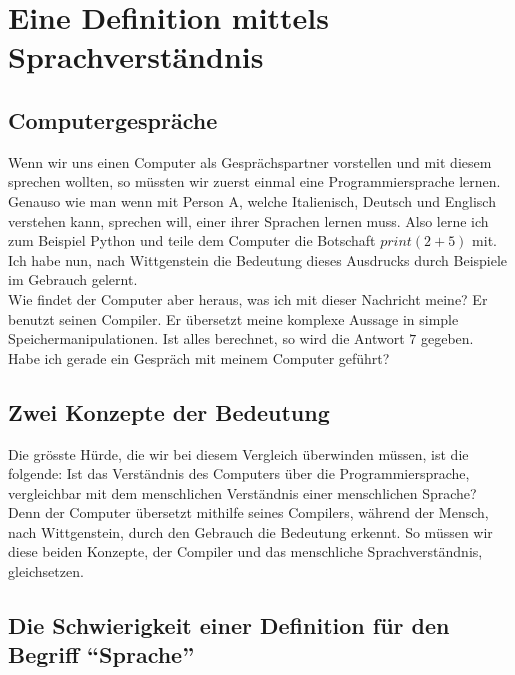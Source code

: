\documentclass[10pt,a4paper]{article}
\begin{document}
\section{Eine Definition mittels Sprachverständnis}
\subsection{Computergespräche}
Wenn wir uns einen Computer als Gesprächspartner vorstellen und mit diesem sprechen wollten, so müssten wir zuerst einmal eine Programmiersprache lernen. Genauso wie man wenn mit Person A, welche Italienisch, Deutsch und Englisch verstehen kann, sprechen will, einer ihrer Sprachen lernen muss. Also lerne ich zum Beispiel Python und teile dem Computer die Botschaft $print(2 + 5)$ mit. Ich habe nun, nach Wittgenstein die Bedeutung dieses Ausdrucks durch Beispiele im Gebrauch gelernt.  \\
Wie findet der Computer aber heraus, was ich mit dieser Nachricht meine? Er benutzt seinen Compiler. Er übersetzt meine komplexe Aussage in simple Speichermanipulationen. Ist alles berechnet, so wird die Antwort $7$ gegeben. \\ Habe ich gerade ein Gespräch mit meinem Computer geführt?

\subsection{Zwei Konzepte der Bedeutung}
Die grösste Hürde, die wir bei diesem Vergleich überwinden müssen, ist die folgende: Ist das Verständnis des Computers über die Programmiersprache, vergleichbar mit dem menschlichen Verständnis einer menschlichen Sprache? Denn der Computer übersetzt mithilfe seines Compilers, während der Mensch, nach Wittgenstein, durch den Gebrauch die Bedeutung erkennt. So müssen wir diese beiden Konzepte, der Compiler und das menschliche Sprachverständnis, gleichsetzen.

\subsection{Die Schwierigkeit einer Definition für den Begriff \enquote{Sprache}}
\end{document}
